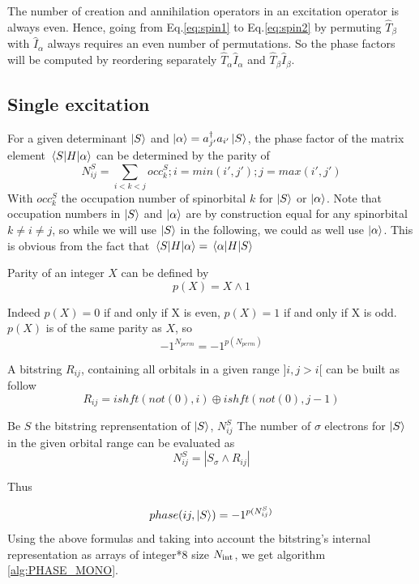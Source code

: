 \documentclass[./thesis.tex]{subfiles}
\begin{document}
The number of creation and annihilation operators in an excitation operator is always even. Hence, going from Eq.\eqref{eq:spin1} to Eq.\eqref{eq:spin2} by permuting $\hat{T}_\beta$ with $\hat{I}_\alpha$ always requires an even number of permutations.
So the phase factors will be computed by reordering separately $\hat{T}_\alpha \hat{I}_\alpha$ and $\hat{T}_\beta  \hat{I}_\beta$.




\subsection{Single excitation}


For a given determinant $\ket S$ and $\ket{\alpha}=a^\dagger_{j'} a_{i'}  \ket S$, the phase factor of the matrix element $\mel{S}{H}{\alpha}$ can be determined by the parity of
$$N^{S}_{ij}=\sum_{i<k<j} occ^{S}_{k};i=min(i',j');j=max(i',j')$$
With $occ^{S}_{k}$ the occupation number of spinorbital $k$ for $\ket S$ or $\ket \alpha$. Note that occupation numbers in $\ket S$ and $\ket \alpha$ are by construction equal for any spinorbital $k \neq i \neq j$, so while we will use $\ket S$ in the following, we could as well use $\ket \alpha$. This is obvious from the fact that $\mel{S}{H}{\alpha}=\mel{\alpha}{H}{S}$  

Parity of an integer $X$ can be defined by $$p(X)=X \wedge 1$$
        
Indeed $p(X)=0$ if and only if X is even, $p(X)=1$ if and only if X is odd. $p(X)$ is of the same parity as $X$, so 
$$-1^{N_{perm}} = -1^{p(N_{perm})}$$
        
        

A bitstring $R_{ij}$, containing all orbitals in a given range $]i, j>i[$ can be built as follow
$$R_{ij}=ishft(not(0),i) \oplus ishft(not(0),j-1)$$


Be $S$ the bitstring reprensentation of $\ket S$, $N^{S}_{ij}$ The number of $\sigma$ electrons for $\ket S$ in the given orbital range can be evaluated as
$$N^{S}_{ij} = |S_\sigma \wedge R_{ij}|$$

Thus 

$$phase(ij, \ket S) = -1^{p(N^S_{ij})}$$
Using the above formulas and taking into account the bitstring's internal representation as arrays of integer*8 size ${N_\text{int}}$, we get algorithm \ref{alg:PHASE_MONO}.   
\end{document}
